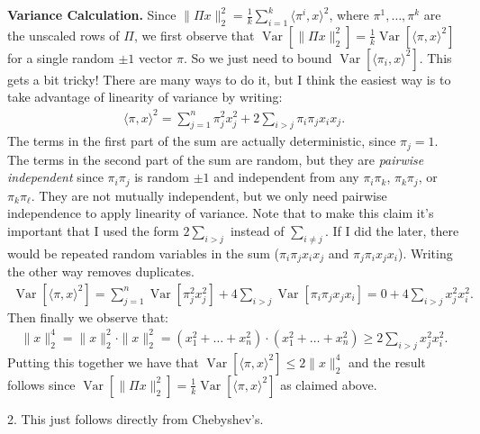 \documentclass[11pt]{article}
\DeclareMathOperator{\var}{Var}
\begin{document}
 \textbf{Variance Calculation.} Since $\|\Pi x\|_2^2 = \frac{1}{k}\sum_{i=1}^k \langle \pi^i, x\rangle^2$, where $\pi^1, \ldots, \pi^k$ are the unscaled rows of $\Pi$, we first observe that $\var[\|\Pi x\|_2^2 ] = \frac{1}{k}\var[\langle \pi, x\rangle^2]$ for a single random $\pm 1$ vector $\pi$. So we just need to bound $\var[\langle \pi_i, x\rangle^2]$. This gets a bit tricky! There are many ways to do it, but I think the easiest way is to take advantage of linearity of variance by writing:
 \begin{align*}
 	\langle \pi, x\rangle^2 = \sum_{j=1}^n \pi_j^2 x_j^2 + 2\sum_{i> j} \pi_i\pi_j x_ix_j. 
 \end{align*}
The terms in the first part of the sum are actually deterministic, since $\pi_j = 1$. The terms in the second part of the sum are random, but they are \emph{pairwise independent} since $\pi_i\pi_j$ is random $\pm 1$ and independent from any $\pi_i\pi_k$, $\pi_k\pi_j$, or $\pi_k\pi_{\ell}$. They are not mutually independent, but we only need pairwise independence to apply linearity of variance. 
Note that to make this claim it's important that I used the form $2\sum_{i> j}$ instead of $\sum_{i\neq j}$. If I did the later, there would be repeated random variables in the sum ($\pi_i\pi_j x_ix_j$  and $\pi_j\pi_i x_jx_i$). Writing the other way removes duplicates.
\begin{align*}
	\var[\langle \pi, x\rangle^2] = \sum_{j=1}^n \var[\pi_j^2 x_j^2] + 4\sum_{i> j} \var[\pi_i\pi_j x_jx_i] = 0 + 4\sum_{i> j} x_j^2x_i^2.
\end{align*}
Then finally we observe that:
\begin{align*}
	\|x\|_2^4 = \|x\|_2^2\cdot \|x\|_2^2 = (x_1^2 + \ldots + x_n^2)\cdot (x_1^2 + \ldots + x_n^2) \geq 2\sum_{i> j} x_j^2x_i^2.
\end{align*} 
Putting this together we have that $\var[\langle \pi, x\rangle^2]  \leq 2 	\|x\|_2^4$ and the result follows since $\var[\|\Pi x\|_2^2 ] = \frac{1}{k}\var[\langle \pi, x\rangle^2]$ as claimed above.

\vspace{.5em}
2. This just follows directly from Chebyshev's.
\end{document}
